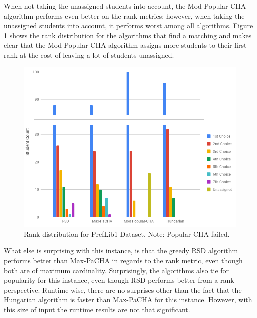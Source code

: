 When not taking the unassigned students into account, the Mod-Popular-CHA algorithm performs even better on the rank metrics; however, when taking the unassigned students into account, it performs worst among all algorithms. Figure \ref{fig:preflib1-rank-distribution} shows the rank distribution for the algorithms that find a matching and makes clear that the Mod-Popular-CHA algorithm assigns more students to their first rank at the cost of leaving a lot of students unassigned. 

\begin{figure}[h!]
  \centering
    \includegraphics[width=0.9\linewidth]{assets/plots/preflib1-cropped.png}
    \caption{Rank distribution for PrefLib1 Dataset. Note: Popular-CHA failed.}
    \label{fig:preflib1-rank-distribution}
\end{figure}

What else is surprising with this instance, is that the greedy RSD algorithm performs better than Max-PaCHA in regards to the rank metric, even though both are of maximum cardinality. Surprisingly, the algorithms also tie for popularity for this instance, even though RSD performs better from a rank perspective. Runtime wise, there are no surprises other than the fact that the Hungarian algorithm is faster than Max-PaCHA for this instance. However, with this size of input the runtime results are not that significant.

